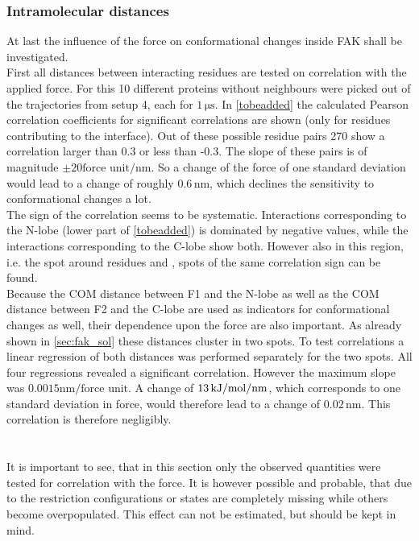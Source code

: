 \subsubsection{Intramolecular distances}
\label{forceana:intramolec}
At last the influence of the force on conformational changes inside FAK shall be investigated.\\
First all distances between interacting residues are tested on correlation with the applied force. For this 10 different proteins without neighbours were picked out of the trajectories from setup 4, each for $1\,\si{\micro\second}$. In \autoref{tobeadded} the calculated Pearson correlation coefficients for significant correlations are shown (only for residues contributing to the interface). Out of these possible residue pairs 270 show a correlation larger than 0.3 or less than -0.3. The slope of these pairs is of magnitude $\pm 20 \text{force unit}/\si{\nano\metre}$. So a change of the force of one standard deviation would lead to a change of roughly $0.6\,\si{\nano\metre}$, which declines the sensitivity to conformational changes a lot.\\
The sign of the correlation seems to be systematic. Interactions corresponding to the N-lobe (lower part of \autoref{tobeadded}) is dominated by negative values, while the interactions corresponding to the C-lobe show both. However also in this region, i.e. the spot around residues  and , spots of the same correlation sign can be found.\\
Because the COM distance between F1 and the N-lobe as well as the COM distance between F2 and the C-lobe are used as indicators for conformational changes as well, their dependence upon the force are also important. As already shown in \autoref{sec:fak_sol} these distances cluster in two spots. To test correlations a linear regression of both distances was performed separately for the two spots. All four regressions revealed a significant correlation. However the maximum slope was $0.0015 \si{\nano\metre}/\text{force unit}$. A change of $13\,\si{\kilo\joule/\mole/\nano\metre}$, which corresponds to one standard deviation in force, would therefore lead to a change of $0.02\,\si{\nano\metre}$. This correlation is therefore negligibly.\\
\\
\\
It is important to see, that in this section only the observed quantities were tested for correlation with the force. It is however possible and probable, that due to the restriction configurations or states are completely missing while others become overpopulated. This effect can not be estimated, but should be kept in mind.